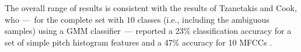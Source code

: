 \documentclass{article}
\begin{document}
The overall range of results is consistent with the results of Tzanetakis and Cook, who ---~for the complete set with $10$ classes (i.e., including the ambiguous samples) using a GMM classifier~--- reported a 23\% classification accuracy for a set of simple pitch histogram features and a 47\% accuracy for 10 MFCCs \cite{tzanetakis_musical_2002}. 




\end{document}
